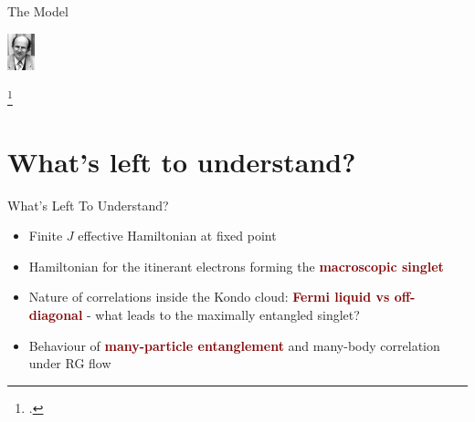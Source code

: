 \documentclass[aspectratio=169]{beamer}
\newcommand{\focus}[1]{\textcolor{maroon}{\textbf{#1}}}
\begin{document}
\begin{frame}[noframenumbering]{The Model}
{\begin{textblock*}{\textwidth}
	\hspace*{\fill}
	\includegraphics[height=30pt]{figures/nozieres.jpg}
	\hspace*{\fill}
\end{textblock*}
\footcite{anderson1969exact,anderson1970,wilson1975,andreiKondoreview,andrei_kondo,wiegmann_kondoexact_1981,nozieres1974fermi}
}
\end{frame}

\section{What's left to understand?}
\begin{frame}[noframenumbering]{What's Left To Understand?}
  
\begin{itemize}[<+-|alert@+>]
	\item Finite \(J\) effective Hamiltonian at fixed point
	\vspace*{20pt}
	\item Hamiltonian for the itinerant electrons forming the \focus{macroscopic singlet}
	\vspace*{20pt}
	\item Nature of correlations inside the Kondo cloud: \focus{Fermi liquid vs off-diagonal} - what leads to the maximally entangled singlet?
	\vspace*{20pt}
	\item Behaviour of \focus{many-particle entanglement} and many-body correlation under RG flow
\end{itemize}

\end{frame}
\end{document}
